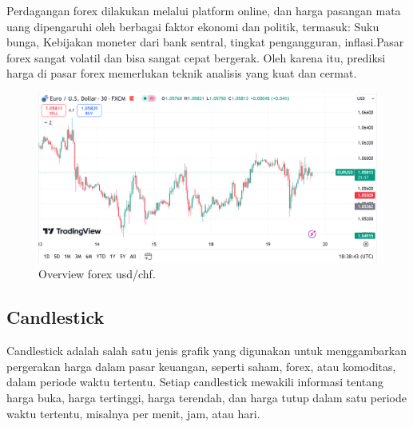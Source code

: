 Perdagangan forex dilakukan melalui platform online, dan harga pasangan mata uang dipengaruhi oleh berbagai faktor ekonomi dan politik, termasuk:
Suku bunga, Kebijakan moneter dari bank sentral, tingkat pengangguran, inflasi.Pasar forex sangat volatil dan bisa sangat cepat bergerak. Oleh karena itu, prediksi harga di pasar forex memerlukan teknik analisis yang kuat dan cermat.
\begin{figure} [H] \centering
  \includegraphics[scale=0.5]{gambar/gambarpasarmodal.png} 
    \caption{Overview forex usd/chf.}
    \label{fig:label_gambar}
\end{figure}

\subsection{Candlestick}
Candlestick adalah salah satu jenis grafik yang digunakan untuk menggambarkan pergerakan harga dalam pasar keuangan, seperti saham, forex, atau komoditas, dalam periode waktu tertentu. Setiap candlestick mewakili informasi tentang harga buka, harga tertinggi, harga terendah, dan harga tutup dalam satu periode waktu tertentu, misalnya per menit, jam, atau hari.

